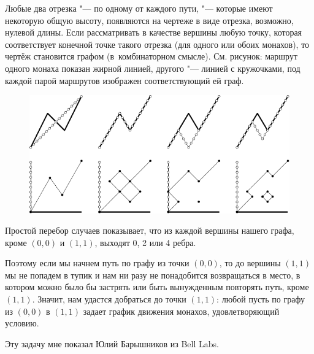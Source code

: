 \documentclass[twoside]{book}
\begin{document}
Любые два отрезка "--- по одному от каждого пути, "--- которые имеют
некоторую общую высоту, появляются на чертеже в виде отрезка, возможно,
нулевой длины.
Если рассматривать в качестве вершины любую точку,
которая соответствует конечной точке такого отрезка (для одного или
обоих монахов), то чертёж становится графом (в~комбинаторном смысле).
См. рисунок: маршрут одного монаха показан жирной линией, другого "---
линией с кружочками, под каждой парой маршрутов изображен
соответствующий ей граф.

\begin{figure}[t]
\vspace{2\jot}
\centering
\includegraphics[scale=1]{mp/wink-27}
\end{figure} 

Простой перебор случаев показывает, что из каждой вершины нашего
графа, кроме $(0,0)$ и $(1,1)$, выходят 0, 2 или 4 ребра.

Поэтому если мы начнем путь по графу из точки $(0,0)$, то до вершины
$(1,1)$ мы не попадем в тупик и нам ни разу не понадобится
возвращаться в место, в котором можно было бы застрять или быть
вынужденным повторять путь, кроме~$(1,1)$.
Значит, нам удастся добраться до
точки $(1,1)$: любой пусть по графу из $(0,0)$ в $(1,1)$ задает график
движения монахов, удовлетворяющий условию. \heart

\medskip

{Эту задачу мне показал Юлий Барышников из Bell Labs.}
\end{document}
